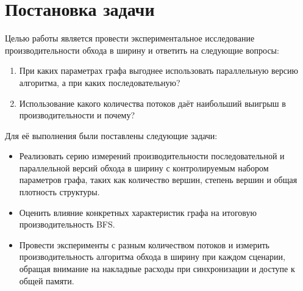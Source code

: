 
\section{Постановка задачи}
\label{sec:task}
 Целью работы является провести экспериментальное исследование производительности обхода в ширину и ответить на следующие вопросы: 
\begin{enumerate}
    \item При каких параметрах графа выгоднее использовать параллельную версию алгоритма, а при каких последовательную?
    \item Использование какого количества потоков даёт наибольший выигрыш в производительности и почему?
\end{enumerate}

 Для её выполнения были постав\-лены следующие задачи:
 \begin{itemize}
 \item  Реализовать серию измерений производительности последовательной и параллельной версий обхода в ширину с контролируемым набором параметров графа, таких как количество вершин, степень вершин и общая плотность структуры.
 \item  Оценить влияние конкретных характеристик графа на итоговую производительность BFS.
 \item  Провести эксперименты с разным количеством потоков и измерить производительность алгоритма обхода в ширину при каждом сценарии, обращая внимание на накладные расходы при синхронизации и доступе к общей памяти.
 \end{itemize}
